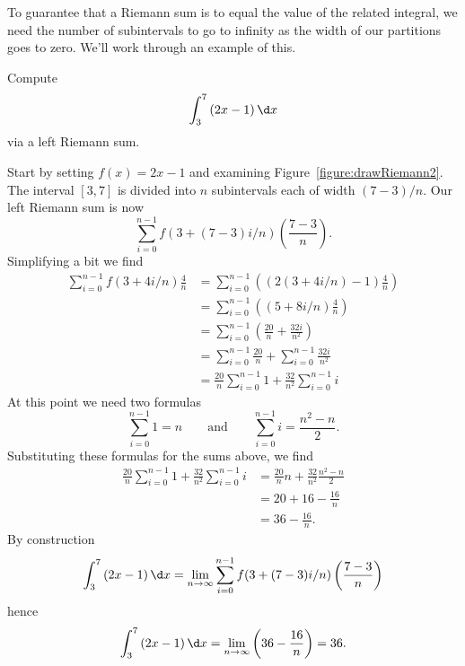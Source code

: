 To guarantee that a Riemann sum is to equal the value of the related
integral, we need the number of subintervals to go to infinity as the
width of our partitions goes to zero. We'll work through an example of
this.

\begin{example}
Compute
\[
\int_3^7 \left(2x-1\right)\d x
\]
via a left Riemann sum.
\end{example}

\begin{solution}
Start by setting $f(x) = 2x-1$ and examining
Figure~\ref{figure:drawRiemann2}.  The interval $[3,7]$ is divided
into $n$ subintervals each of width $(7-3)/n$. Our left Riemann sum is
now
\[
\sum_{i=0}^{n-1} f(3+(7-3)i/n) \left(\frac{7-3}{n}\right).
\]
Simplifying a bit we find
\begin{align*}
\sum_{i=0}^{n-1} f(3+4i/n) \frac{4}{n} &= \sum_{i=0}^{n-1} \left((2(3+4i/n) -1 )\frac{4}{n}\right)\\
&= \sum_{i=0}^{n-1} \left((5+8i/n )\frac{4}{n}\right)\\
&= \sum_{i=0}^{n-1} \left(\frac{20}{n} + \frac{32i}{n^2}\right)\\
&= \sum_{i=0}^{n-1} \frac{20}{n} + \sum_{i=0}^{n-1}\frac{32i}{n^2}\\
&= \frac{20}{n}\sum_{i=0}^{n-1} 1 +\frac{32}{n^2} \sum_{i=0}^{n-1} i
\end{align*}
At this point we need two formulas
\[
\sum_{i=0}^{n-1}1 = n \qquad\text{and}\qquad \sum_{i=0}^{n-1} i = \frac{n^2-n}{2}.
\]
Substituting these formulas for the sums above, we find 
\begin{align*}
\frac{20}{n}\sum_{i=0}^{n-1} 1 +\frac{32}{n^2} \sum_{i=0}^{n-1} i &=\frac{20}{n}n +\frac{32}{n^2}\frac{n^2-n}{2}\\
&=20 +16 -\frac{16}{n}\\
&=36 - \frac{16}{n}.
\end{align*}
By construction
\[
\int_3^7 \left(2x-1\right) \d x = \lim_{n\to \infty}\sum_{i=0}^{n-1} f(3+(7-3)i/n) \left(\frac{7-3}{n}\right)
\]
hence
\[
\int_3^7 \left(2x-1 \right)\d x = \lim_{n\to \infty} \left(36 - \frac{16}{n}\right) = 36.
\]
\end{solution}


